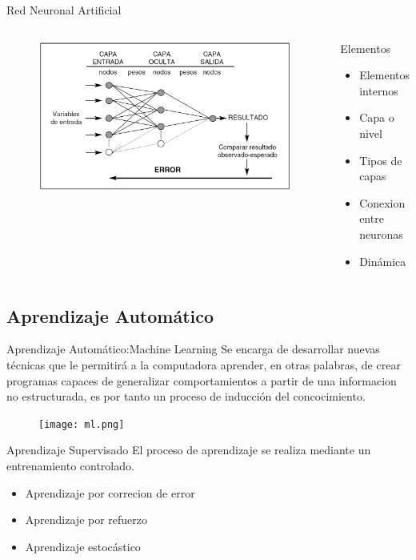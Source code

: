 \documentclass{beamer}
\begin{document}
\begin{frame}{Red Neuronal Artificial}
\begin{columns}
\begin{figure}
\includegraphics[scale=0.17]{elementos1.png}
\end{figure}
\begin{block}{Elementos}
\begin{itemize}
\item {Elementos internos\pause}
\item {Capa o nivel\pause}
\item {Tipos de capas\pause}
\item {Conexion entre neuronas\pause}
\item {Dinámica}
\end{itemize}
\end{block}
\end{columns}
\end{frame}

\subsection{Aprendizaje Automático}
\begin{frame}{Aprendizaje Automático:}{Machine Learning}
Se encarga de desarrollar nuevas técnicas que le permitirá a la computadora aprender, en otras palabras, de crear programas capaces de generalizar comportamientos a partir de una informacion no estructurada, es por tanto un proceso de inducción del concocimiento.
\begin{figure}
\texttt{[image: ml.png]}
\end{figure}
\end{frame}

\begin{frame}
\begin{block}{Aprendizaje Supervisado}
El proceso de aprendizaje se realiza mediante un entrenamiento controlado.\pause
\begin{itemize}
\item {Aprendizaje por correcion de error\pause}
\item {Aprendizaje por refuerzo\pause}
\item {Aprendizaje estocástico}
\end{itemize}
\end{block}
\end{frame}
\end{document}
